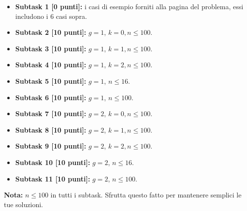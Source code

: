   \begin{itemize}
    \item \textbf{Subtask 1 [0 punti]:} i casi di esempio forniti alla pagina del problema, essi includono i 6 casi sopra.
    \item \textbf{Subtask 2 [10 punti]:} $g=1$, $k=0, n \le 100$.
    \item \textbf{Subtask 3 [10 punti]:} $g=1$, $k=1, n \le 100$.
    \item \textbf{Subtask 4 [10 punti]:} $g=1$, $k=2, n \le 100$.
    \item \textbf{Subtask 5 [10 punti]:} $g=1$, $n \le 16$.
    \item \textbf{Subtask 6 [10 punti]:} $g=1$, $n \le 100$.
    \item \textbf{Subtask 7 [10 punti]:} $g=2$, $k=0, n \le 100$.
    \item \textbf{Subtask 8 [10 punti]:} $g=2$, $k=1, n \le 100$.
    \item \textbf{Subtask 9 [10 punti]:} $g=2$, $k=2, n \le 100$.
    \item \textbf{Subtask 10 [10 punti]:} $g=2$, $n \le 16$.
    \item \textbf{Subtask 11 [10 punti]:} $g=2$, $n \le 100$.
  \end{itemize}
  
{\bf Nota:} $n\leq 100$ in tutti i subtask. Sfrutta questo fatto per mantenere semplici le tue soluzioni.
